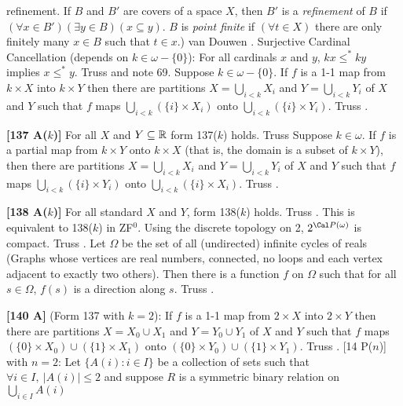 refinement. If $B$ and $B'$ are covers of a space $X$, then $B'$ is a {\it
refinement} of $B$ if $(\forall x\in B')(\exists y\in B)(x\subseteq y)$.
$B$ is {\it point finite} if $(\forall t\in X)$ there are only finitely
many $x\in B$ such that $t\in x$.) van \ac{Douwen} \cite{1980}.
\medskip
{} Surjective Cardinal Cancellation (depends on
$k\in\omega-\{0\}$): For all cardinals $x$ and $y$, $kx\le^* ky$ implies
$x\le^* y$. \ac{Truss} \cite{1984} and note 69.
\medskip
{} Suppose $k\in\omega-\{0\}$. If $f$ is a 1-1
map from $k\times X$ into $k\times Y$ then there are partitions $X =
\bigcup^{}_{i<k} X_{i}$ and $Y = \bigcup^{}_{i<k} Y_{i}$ of $X$ and $Y$
such that $f$ maps $\bigcup^{}_{i<k} (\{i\} \times  X_{i})$ onto
$\bigcup^{}_{i<k} (\{i\} \times  Y_{i})$.  \ac{Truss} \cite{1984}.
\smallskip
\item{}{\bf [137 A($k$)]} For all $X$ and $Y\subseteq{\Bbb R}$ form
137($k$) holds.  \ac{Truss} \cite{1984}
\medskip
{} Suppose $k\in\omega$.  If $f$ is a
partial map from $k\times Y$  onto $k\times X$ (that is, the domain
is a subset of $k\times Y$), then there are partitions $X =
\bigcup^{}_{i<k} X_{i}$  and $Y = \bigcup^{}_{i<k} Y_{i}$ of $X$ and $Y$
such that $f$ maps $\bigcup^{}_{i<k} (\{i\} \times Y_{i})$ onto
$\bigcup^{}_{i<k} (\{i\} \times X_{i})$.  \ac{Truss} \cite{1984}.
\smallskip
\item{}{\bf [138 A($k$)]} For all standard $X$ and $Y$, form 138($k$)
holds. \ac{Truss} \cite{1984}. This is equivalent to 138($k$) in ZF$^0$.
\medskip
{} Using the discrete topology on 2,
$2^{\Cal P(\omega)}$ is compact. \ac{Truss} \cite{1984}.
\medskip
{} Let $\Omega$ be the set of all (undirected)
infinite cycles of reals (Graphs whose vertices are real numbers,
connected, no loops and each vertex adjacent to  exactly two others). Then
there is a function $f$ on $\Omega $ such that for all $s\in\Omega$,
$f(s)$ is a direction along $s$.  \ac{Truss} \cite{1984}.
\smallskip
\item{}{\bf [140 A]}  (Form 137 with $k = 2$):  If $f$ is a 1-1
map from $2\times X$ into $2\times Y$ then there are partitions $X =
X_0 \cup X_1$ and $Y = Y_0 \cup Y_1$ of $X$ and $Y$
such that $f$ maps $(\{0\}\times X_0)\cup (\{1\}\times X_1)$ onto
$(\{0\}\times Y_0)\cup (\{1\}\times Y_1)$.  \ac{Truss} \cite{1984}.
\medskip
{} [14 P($n$)] with $n = 2$:  Let $\{A(i): i\in I\}$
be a collection of sets such that $\forall i\in I,\ |A(i)|\le 2$ and
suppose $R$ is a symmetric binary relation on $\bigcup^{}_{i\in I} A(i)$
